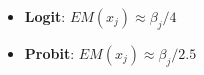 \begin{itemize}
    \item \textbf{Logit}: $EM(x_j) \approx \beta_j/4$
    \item \textbf{Probit}: $EM(x_j) \approx \beta_j/2.5$
\end{itemize}



